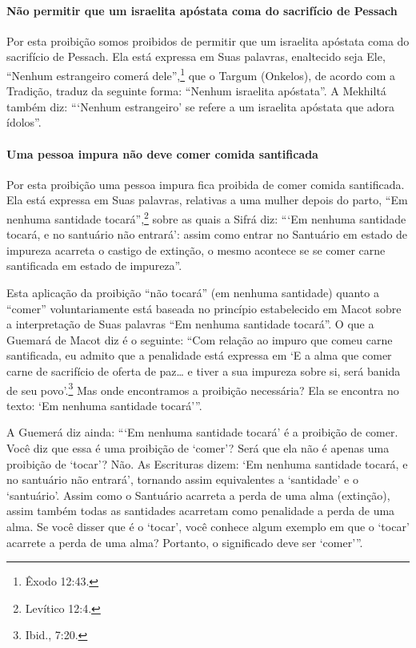 \paragraph{Não permitir que um israelita apóstata coma do sacrifício de Pessach}

Por esta proibição somos proibidos de permitir que um israelita
apóstata coma do sacrifício de Pessach. Ela está expressa em Suas
palavras, enaltecido seja Ele, ``Nenhum estrangeiro comerá dele'',\footnote{Êxodo 12:43.} que o Targum
(Onkelos), de acordo com a Tradição, traduz da seguinte forma: ``Nenhum
israelita apóstata''. A Mekhiltá também diz: ```Nenhum estrangeiro' se
refere a um israelita apóstata que adora ídolos''.

\paragraph{Uma pessoa impura não deve comer comida santificada}

Por esta proibição uma pessoa impura fica proibida de comer comida
santificada. Ela está expressa em Suas palavras, relativas a uma mulher
depois do parto, ``Em nenhuma santidade tocará'',\footnote{Levítico 12:4.} sobre
as quais a Sifrá diz: ```Em nenhuma santidade tocará, e no santuário não
entrará': assim como entrar no Santuário em estado de impureza acarreta
o castigo de extinção, o mesmo acontece se se comer carne santificada em
estado de impureza''.

Esta aplicação da proibição ``não tocará'' (em nenhuma santidade) quanto
a ``comer'' voluntariamente está baseada no princípio estabelecido em
Macot sobre a interpretação de Suas palavras ``Em nenhuma santidade
tocará''. O que a Guemará de Macot diz é o seguinte: ``Com relação ao
impuro que comeu carne santificada, eu admito que a penalidade está
expressa em `E a alma que comer carne de sacrifício de oferta de paz\ldots{}
e tiver a sua impureza sobre si, será banida de seu povo'.\footnote{Ibid., 7:20.}
Mas onde encontramos a proibição necessária? Ela se encontra no texto:
`Em nenhuma santidade tocará'''.

A Guemerá diz ainda: ```Em nenhuma santidade tocará' é a proibição de
comer. Você diz que essa é uma proibição de `comer'? Será que ela não é
apenas uma proibição de `tocar'? Não. As Escrituras dizem: `Em nenhuma
santidade tocará, e no santuário não entrará', tornando assim
equivalentes a `santidade' e o `santuário'. Assim como o Santuário
acarreta a perda de uma alma (extinção), assim também todas as
santidades acarretam como penalidade a perda de uma alma. Se você disser
que é o `tocar', você conhece algum exemplo em que o `tocar' acarrete a
perda de uma alma? Portanto, o significado deve ser `comer'''.

